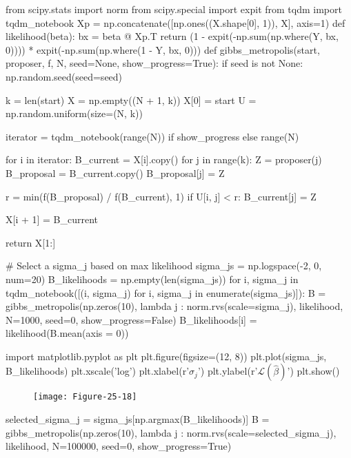 \begin{python}
from scipy.stats import norm
from scipy.special import expit
from tqdm import tqdm_notebook
Xp = np.concatenate([np.ones((X.shape[0], 1)), X], axis=1)
def likelihood(beta):
    bx = beta @ Xp.T
    return (1 - expit(-np.sum(np.where(Y, bx, 0)))) * expit(-np.sum(np.where(1 - Y, bx, 0)))
def gibbs_metropolis(start, proposer, f, N, seed=None, show_progress=True):
    if seed is not None:
        np.random.seed(seed=seed)
    
    k = len(start)
    X = np.empty((N + 1, k))
    X[0] = start
    U = np.random.uniform(size=(N, k))
    
    iterator = tqdm_notebook(range(N)) if show_progress else range(N)
    
    for i in iterator:
        B_current = X[i].copy()
        for j in range(k):
            Z = proposer(j)
            B_proposal = B_current.copy()
            B_proposal[j] = Z
            
            r = min(f(B_proposal) / f(B_current), 1)
            if U[i, j] < r:
                B_current[j] = Z
                
        X[i + 1] = B_current
    
    return X[1:]
\end{python}

\begin{python}
# Select a sigma_{j} based on max likelihood
sigma_{j}s = np.logspace(-2, 0, num=20)
B_likelihoods = np.empty(len(sigma_{j}s))
for i, sigma_{j} in tqdm_notebook([(i, sigma_{j}) for i, sigma_{j} in enumerate(sigma_{j}s)]):
    B = gibbs_metropolis(np.zeros(10), lambda j : norm.rvs(scale=sigma_{j}), likelihood, 
        N=1000, seed=0, show_progress=False)
    B_likelihoods[i] = likelihood(B.mean(axis = 0))
\end{python}

\begin{python}
import matplotlib.pyplot as plt
plt.figure(figsize=(12, 8))
plt.plot(sigma_{j}s, B_likelihoods)
plt.xscale('log')
plt.xlabel(r'$\sigma_{j}$')
plt.ylabel(r'$\mathcal{L}(\hat{\beta})$')
plt.show()
\end{python}

\begin{figure}[H]
\centering
\texttt{[image: Figure-25-18]}
\end{figure}


\begin{python}
selected_sigma_{j} = sigma_{j}s[np.argmax(B_likelihoods)]
B = gibbs_metropolis(np.zeros(10), lambda j : norm.rvs(scale=selected_sigma_{j}), likelihood, 
         N=100000, seed=0, show_progress=True)
\end{python}

